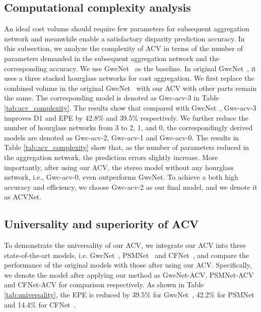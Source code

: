 \documentclass[10pt,twocolumn,letterpaper]{article}
\begin{document}
\subsection{Computational complexity analysis} \label{sec:High efficiency}
An ideal cost volume should require few parameters for subsequent aggregation network and meanwhile enable a satisfactory disparity prediction accuracy. In this subsection, we analyze the complexity of ACV in terms of the number of parameters demanded in the subsequent aggregation network and the corresponding accuracy. We use GwcNet~\cite{guo2019group} as the baseline. In original GwcNet~\cite{guo2019group}, it uses a three stacked hourglass networks for cost aggregation. We first replace the combined volume in the original GwcNet~\cite{guo2019group} with our ACV with other parts remain the same. The corresponding model is denoted as Gwc-acv-3 in Table \ref{tab:acv_complexity}. The results show that compared with GwcNet~\cite{guo2019group}, Gwc-acv-3 improves D1 and EPE by 42.8\% and 39.5\% respectively. We further reduce the number of hourglass networks from 3 to 2, 1, and 0, the correspondingly derived models are denoted as Gwc-acv-2, Gwc-acv-1 and Gwc-acv-0. The results in Table \ref{tab:acv_complexity} show that, as the number of parameters reduced in the aggregation network, the prediction errors slightly increase. 
More importantly, after using our ACV, the stereo model without any hourglass network, i.e., Gwc-acv-0, even outperforms GwcNet.
To achieve a both high accuracy and efficiency, we choose Gwc-acv-2 as our final model, and we denote it as ACVNet.

\subsection{Universality and superiority of ACV} \label{sec:Universality}
To demonstrate the universality of our ACV, we integrate our ACV into three state-of-the-art models, i.e. GwcNet~\cite{guo2019group}, PSMNet~\cite{chang2018pyramid} and CFNet~\cite{shen2021cfnet}, and compare the performance of the original models with those after using our ACV. Specifically, we denote the model after applying our method as GwcNet-ACV, PSMNet-ACV and CFNet-ACV for comparison respectively. As shown in Table \ref{tab:universality}, the EPE is reduced by 39.5\% for GwcNet~\cite{guo2019group}, 42.2\% for PSMNet~\cite{chang2018pyramid} and 14.4\% for CFNet~\cite{shen2021cfnet}.
\end{document}
